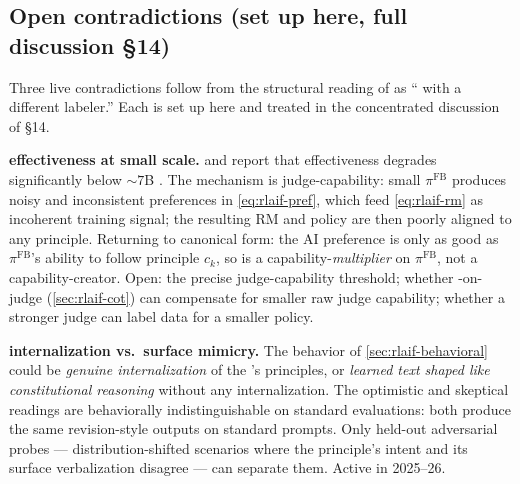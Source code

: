 \subsection{Open contradictions (set up here, full discussion §14)}
\label{sec:rlaif-contradictions}

Three live contradictions follow from the structural reading of  as
`` with a different labeler.'' Each is set up here and treated in
the concentrated discussion of §14.

\begin{contradiction}
\textbf{ effectiveness at small scale.}  and 
report that  effectiveness degrades significantly below
$\sim\!7$B . The mechanism is judge-capability: small
$\pi^{\mathrm{FB}}$ produces noisy and inconsistent preferences in
\cref{eq:rlaif-pref}, which feed \cref{eq:rlaif-rm} as incoherent
training signal; the resulting RM and policy are then poorly aligned
to any principle. Returning to canonical form: the AI preference is
only as good as $\pi^{\mathrm{FB}}$'s ability to follow principle
$c_k$, so  is a capability-\emph{multiplier} on $\pi^{\mathrm{FB}}$,
not a capability-creator. Open: the precise judge-capability
threshold; whether -on-judge (\cref{sec:rlaif-cot}) can compensate
for smaller raw judge capability; whether a stronger judge can label
data for a smaller policy.
\end{contradiction}

\begin{contradiction}
\textbf{ internalization vs.\ surface mimicry.} The 
behavior of \cref{sec:rlaif-behavioral} could be \emph{genuine
internalization} of the 's principles, or \emph{learned
text shaped like constitutional reasoning} without any
internalization. The optimistic and skeptical readings are
behaviorally indistinguishable on standard evaluations: both produce
the same revision-style outputs on standard prompts. Only held-out
adversarial probes — distribution-shifted scenarios where the
principle's intent and its surface verbalization disagree — can
separate them. Active in 2025--26.
\end{contradiction}

